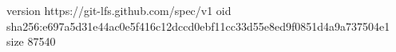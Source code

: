version https://git-lfs.github.com/spec/v1
oid sha256:e697a5d31e44ac0e5f416c12dccd0ebf11cc33d55e8ed9f0851d4a9a737504e1
size 87540
